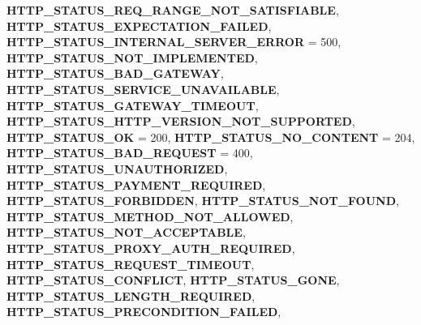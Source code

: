 \begin{DoxyCompactItemize}
{\bfseries H\+T\+T\+P\+\_\+\+S\+T\+A\+T\+U\+S\+\_\+\+R\+E\+Q\+\_\+\+R\+A\+N\+G\+E\+\_\+\+N\+O\+T\+\_\+\+S\+A\+T\+I\+S\+F\+I\+A\+B\+LE}, 
{\bfseries H\+T\+T\+P\+\_\+\+S\+T\+A\+T\+U\+S\+\_\+\+E\+X\+P\+E\+C\+T\+A\+T\+I\+O\+N\+\_\+\+F\+A\+I\+L\+ED}, 
\newline
{\bfseries H\+T\+T\+P\+\_\+\+S\+T\+A\+T\+U\+S\+\_\+\+I\+N\+T\+E\+R\+N\+A\+L\+\_\+\+S\+E\+R\+V\+E\+R\+\_\+\+E\+R\+R\+OR} = 500, 
{\bfseries H\+T\+T\+P\+\_\+\+S\+T\+A\+T\+U\+S\+\_\+\+N\+O\+T\+\_\+\+I\+M\+P\+L\+E\+M\+E\+N\+T\+ED}, 
{\bfseries H\+T\+T\+P\+\_\+\+S\+T\+A\+T\+U\+S\+\_\+\+B\+A\+D\+\_\+\+G\+A\+T\+E\+W\+AY}, 
{\bfseries H\+T\+T\+P\+\_\+\+S\+T\+A\+T\+U\+S\+\_\+\+S\+E\+R\+V\+I\+C\+E\+\_\+\+U\+N\+A\+V\+A\+I\+L\+A\+B\+LE}, 
\newline
{\bfseries H\+T\+T\+P\+\_\+\+S\+T\+A\+T\+U\+S\+\_\+\+G\+A\+T\+E\+W\+A\+Y\+\_\+\+T\+I\+M\+E\+O\+UT}, 
{\bfseries H\+T\+T\+P\+\_\+\+S\+T\+A\+T\+U\+S\+\_\+\+H\+T\+T\+P\+\_\+\+V\+E\+R\+S\+I\+O\+N\+\_\+\+N\+O\+T\+\_\+\+S\+U\+P\+P\+O\+R\+T\+ED}, 
{\bfseries H\+T\+T\+P\+\_\+\+S\+T\+A\+T\+U\+S\+\_\+\+OK} = 200, 
{\bfseries H\+T\+T\+P\+\_\+\+S\+T\+A\+T\+U\+S\+\_\+\+N\+O\+\_\+\+C\+O\+N\+T\+E\+NT} = 204, 
\newline
{\bfseries H\+T\+T\+P\+\_\+\+S\+T\+A\+T\+U\+S\+\_\+\+B\+A\+D\+\_\+\+R\+E\+Q\+U\+E\+ST} = 400, 
{\bfseries H\+T\+T\+P\+\_\+\+S\+T\+A\+T\+U\+S\+\_\+\+U\+N\+A\+U\+T\+H\+O\+R\+I\+Z\+ED}, 
{\bfseries H\+T\+T\+P\+\_\+\+S\+T\+A\+T\+U\+S\+\_\+\+P\+A\+Y\+M\+E\+N\+T\+\_\+\+R\+E\+Q\+U\+I\+R\+ED}, 
{\bfseries H\+T\+T\+P\+\_\+\+S\+T\+A\+T\+U\+S\+\_\+\+F\+O\+R\+B\+I\+D\+D\+EN}, 
\newline
{\bfseries H\+T\+T\+P\+\_\+\+S\+T\+A\+T\+U\+S\+\_\+\+N\+O\+T\+\_\+\+F\+O\+U\+ND}, 
{\bfseries H\+T\+T\+P\+\_\+\+S\+T\+A\+T\+U\+S\+\_\+\+M\+E\+T\+H\+O\+D\+\_\+\+N\+O\+T\+\_\+\+A\+L\+L\+O\+W\+ED}, 
{\bfseries H\+T\+T\+P\+\_\+\+S\+T\+A\+T\+U\+S\+\_\+\+N\+O\+T\+\_\+\+A\+C\+C\+E\+P\+T\+A\+B\+LE}, 
{\bfseries H\+T\+T\+P\+\_\+\+S\+T\+A\+T\+U\+S\+\_\+\+P\+R\+O\+X\+Y\+\_\+\+A\+U\+T\+H\+\_\+\+R\+E\+Q\+U\+I\+R\+ED}, 
\newline
{\bfseries H\+T\+T\+P\+\_\+\+S\+T\+A\+T\+U\+S\+\_\+\+R\+E\+Q\+U\+E\+S\+T\+\_\+\+T\+I\+M\+E\+O\+UT}, 
{\bfseries H\+T\+T\+P\+\_\+\+S\+T\+A\+T\+U\+S\+\_\+\+C\+O\+N\+F\+L\+I\+CT}, 
{\bfseries H\+T\+T\+P\+\_\+\+S\+T\+A\+T\+U\+S\+\_\+\+G\+O\+NE}, 
{\bfseries H\+T\+T\+P\+\_\+\+S\+T\+A\+T\+U\+S\+\_\+\+L\+E\+N\+G\+T\+H\+\_\+\+R\+E\+Q\+U\+I\+R\+ED}, 
\newline
{\bfseries H\+T\+T\+P\+\_\+\+S\+T\+A\+T\+U\+S\+\_\+\+P\+R\+E\+C\+O\+N\+D\+I\+T\+I\+O\+N\+\_\+\+F\+A\+I\+L\+ED}, 

\end{DoxyCompactItemize}
